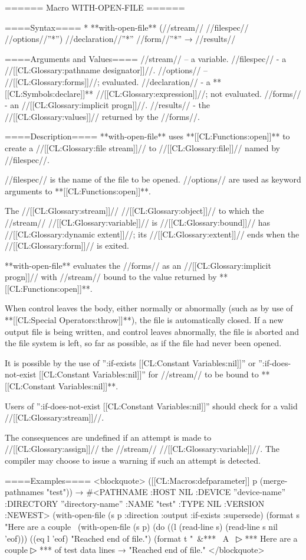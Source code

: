====== Macro WITH-OPEN-FILE ======

====Syntax====
  * **with-open-file** (//stream// //filespec// //options//''*'') //declaration//''*'' //form//''*'' → //results//

====Arguments and Values====
//stream// -- a variable.
//filespec// - a //[[CL:Glossary:pathname designator]]//.
//options// -- //[[CL:Glossary:forms]]//; evaluated.
//declaration// - a **[[CL:Symbols:declare]]** //[[CL:Glossary:expression]]//; not evaluated.
//forms// - an //[[CL:Glossary:implicit progn]]//.
//results// - the //[[CL:Glossary:values]]// returned by the //forms//.

====Description====
**with-open-file** uses **[[CL:Functions:open]]** to create a //[[CL:Glossary:file stream]]// to //[[CL:Glossary:file]]// named by //filespec//.

//filespec// is the name of the file to be opened. //options// are used as keyword arguments to **[[CL:Functions:open]]**.

The //[[CL:Glossary:stream]]// //[[CL:Glossary:object]]// to which the //stream// //[[CL:Glossary:variable]]// is //[[CL:Glossary:bound]]// has //[[CL:Glossary:dynamic extent]]//; its //[[CL:Glossary:extent]]// ends when the //[[CL:Glossary:form]]// is exited.

**with-open-file** evaluates the //forms// as an //[[CL:Glossary:implicit progn]]// with //stream// bound to the value returned by **[[CL:Functions:open]]**.

When control leaves the body, either normally or abnormally (such as by use of **[[CL:Special Operators:throw]]**), the file is automatically closed. If a new output file is being written, and control leaves abnormally, the file is aborted and the file system is left, so far as possible, as if the file had never been opened.

It is possible by the use of '':if-exists [[CL:Constant Variables:nil]]'' or '':if-does-not-exist [[CL:Constant Variables:nil]]'' for //stream// to be bound to **[[CL:Constant Variables:nil]]**.

Users of '':if-does-not-exist [[CL:Constant Variables:nil]]'' should check for a valid //[[CL:Glossary:stream]]//.

The consequences are undefined if an attempt is made to //[[CL:Glossary:assign]]// the //stream// //[[CL:Glossary:variable]]//. The compiler may choose to issue a warning if such an attempt is detected.

====Examples====
<blockquote>
([[CL:Macros:defparameter]] p (merge-pathnames "test")) → #<PATHNAME :HOST NIL :DEVICE ''device-name'' :DIRECTORY ''directory-name'' :NAME "test" :TYPE NIL :VERSION :NEWEST> 
(with-open-file (s p :direction :output :if-exists :supersede) (format s "Here are a couple~ (with-open-file (s p) (do ((l (read-line s) (read-line s nil 'eof))) ((eq l 'eof) "Reached end of file.") (format t "~&*** ~A~
▷ *** Here are a couple
▷ *** of test data lines → "Reached end of file." </blockquote>

